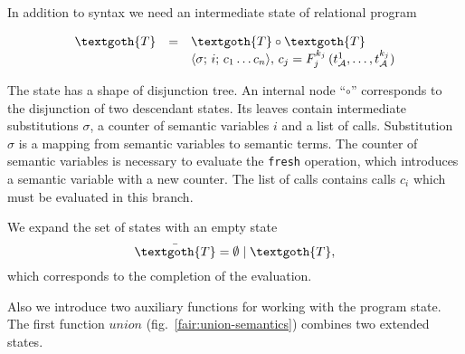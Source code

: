 
In addition to syntax we need an intermediate state of relational program

\[
\begin{array}{rcl}
  \textgoth{T} & = & \textgoth{T} \circ \textgoth{T}\\
               &   & \inbr{\sigma;\, i;\, c_1\dots c_n},\, c_j = F_j^{k_j}\,(t_\mathcal{A}^1,\dots,t_\mathcal{A}^{k_j})
\end{array}
\]

The state has a shape of disjunction tree. An internal node ``$\circ$'' corresponds to the disjunction of two descendant states.
Its leaves contain intermediate substitutions $\sigma$, a counter of semantic variables $i$ and a list of calls. Substitution $\sigma$ is a
mapping from semantic variables to semantic terms. The counter of semantic variables is necessary to evaluate the \lstinline{fresh} operation,
which introduces a semantic variable with a new counter. The list of calls contains calls $c_i$ which must be evaluated in this branch.


We expand the set of states with an empty state
\[
\bar{\textgoth{T}} = \emptyset \mid \textgoth{T},
\]
which corresponds to the completion of the evaluation.

Also we introduce two auxiliary functions for working with the program state. The first function $union$ (fig.~\ref{fair:union-semantics}) combines two extended states.

